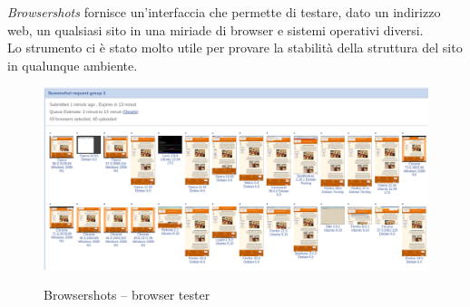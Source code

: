 \emph{Browsershots} fornisce un'interfaccia che permette di testare, dato un indirizzo web, un qualsiasi sito in una miriade di browser 
e sistemi operativi diversi.\\
Lo strumento ci è stato molto utile per provare la stabilità della struttura del sito in qualunque ambiente. 

\begin{figure}[!h]
	\centering
	\includegraphics[width=0.7\linewidth]{sezioni/FaseTest/Immagini/browsershots.png}\\
	\caption{Browsershots – browser tester}
	\label{Fig:browsershots}
\end{figure} 
\newpage